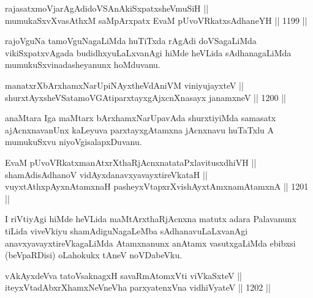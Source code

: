 
\begin{shl}
rajasatxmoVjarAgAdidoVSAnAkiSxpatxsheVmuSiH || \\
mumukaSxvXvasAthxM saMpArxpatx EvaM pUvoVRkatxsAdhaneYH \hfill || 1199 ||  
\end{shl}

\begin{artha}
rajoVguNa tamoVguNagaLiMda huTiTxda rAgAdi doVSagaLiMda vikiSxpatxvAgada budidhxyuLaLxvanAgi hiMde heVLida sAdhanagaLiMda mumukuSxvinadasheyanunx hoMduvanu.
\end{artha}


\begin{shl}
manatxrXbArxhamxNarUpiNAyx\s theVdAniVM viniyujayxteV || \\
shurxtAyx\s sheVSatamoVGAtiparxtayxgAjxcnXnasayx janamxneV \hfill || 1200 ||  
\end{shl}

\begin{artha}
anaMtara Iga maMtarx bArxhamxNarUpavAda shurxtiyiMda samasatx ajAcnxnavanUnx kaLeyuva parxtayxgAtamxna jAcnxnavu huTaTxlu A mumukuSxvu niyoVgisalapxDuvanu.
\end{artha}


\begin{shl}
EvaM pUvoVRkatxmanAtxrXthaRjAcnxnatataPxlavitusxdhiVH || \\
shamAdisAdhanoV vidAyxdanavxyavayxtireVkataH || \\
vuyxtAthxpAyxnAtamxnaH pasheyxVtapxrXvishAyx\s \s tAmxnamAtamxnA \hfill || 1201 || 
\end{shl} 

\begin{artha}
I riVtiyAgi hiMde heVLida maMtArxthaRjAcnxna matutx adara Palavanunx tiLida viveVkiyu shamAdiguNagaLeMba sAdhanavuLaLxvanAgi anavxyavayxtireVkagaLiMda Atamxnanunx anAtamx vasutxgaLiMda ebibxsi (beVpaRDisi) oLahokukx tAneV noVDabeVku.
\end{artha}

\begin{shl}
vAkAyxdeVva tatoV\s saknagxH savaRmAtomxVti viVkaSxteV || \\
iteyxVtadAbxrXhamxNeVneVha parxyatenxVna vidhiVyateV \hfill || 1202 ||  
\end{shl}

